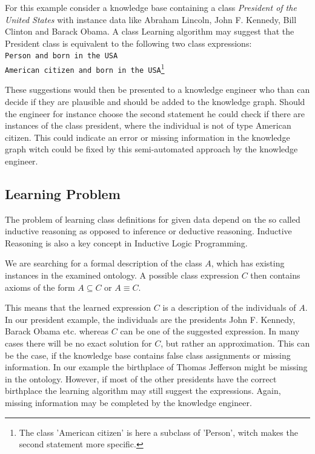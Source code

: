 \begin{example}
For this example consider a knowledge base containing a class \emph{President of
the United States} with instance data like Abraham Lincoln, John F. Kennedy,
Bill Clinton and Barack Obama. A class Learning algorithm may suggest that the
President class is equivalent to the following two class expressions:
\\\hspace*{12pt}\texttt{Person and born in the USA}\\
\hspace*{12pt}\texttt{American citizen and born in the USA}\footnote{The class
'American citizen' is here a subclass of 'Person', witch makes the second
statement more specific.}
\end{example}

These suggestions would then be presented to a knowledge engineer who than can
decide if they are plausible and should be added to the knowledge graph. Should
the engineer for instance choose the second statement he could check if there
are instances of the class president, where the individual is not of type
American citizen. This could indicate an error or missing information in the
knowledge graph witch could be fixed by this semi-automated approach by the
knowledge engineer.


\subsection{Learning Problem}
The problem of learning class definitions for given data depend on the so called
inductive reasoning as opposed to inference or deductive reasoning. \cite{paper1}
Inductive Reasoning is also a key concept in Inductive Logic Programming.

\begin{definition}
We are searching for a formal description of the class $A$, which has existing
instances in the examined ontology. A possible class expression $C$ then
contains axioms of the form $A \subseteq C$ or $A \equiv C$.
\end{definition}

This means that the learned expression $C$ is a description of the individuals
of $A$. In our president example, the individuals are the presidents John F.
Kennedy, Barack Obama etc. whereas $C$ can be one of the suggested expression.
In many cases there will be no exact solution for $C$, but rather an
approximation. This can be the case, if the knowledge base contains false class
assignments or missing information. In our example the birthplace of Thomas
Jefferson might be missing in the ontology. However, if most of the other
presidents have the correct birthplace the learning algorithm may still suggest
the expressions. Again, missing information may be completed by the knowledge
engineer.

